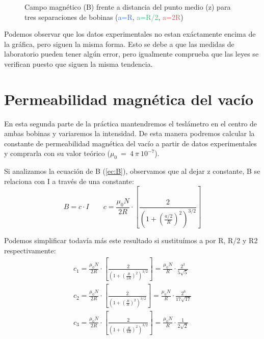 \documentclass[12pt, a4paper, titlepage]{article}
\begin{document}
  \begin{figure}[H]
    \hspace{2.5em} 
    \caption{Campo magnético (B) frente a distancia del punto medio (z) para tres separaciones de bobinas (\textcolor{RoyalBlue}{a=R}, \textcolor{MediumSeaGreen}{a=R/2}, \textcolor{IndianRed}{a=2R})}
  \end{figure}

  Podemos observar que los datos experimentales no estan exáctamente encima de la gráfica, pero siguen la misma forma. Esto se debe a que las medidas de laboratorio pueden tener algún error, pero igualmente comprueba que las leyes se verifican puesto que siguen la misma tendencia.


  \newpage
  \section{Permeabilidad magnética del vacío}

  En esta segunda parte de la práctica mantendremos el teslámetro en el centro de ambas bobinas y variaremos la intensidad. De esta manera podremos calcular la constante de permeabilidad magnética del vacío a partir de datos experimentales y comprarla con su valor teórico ($\mu_0~=~4~\pi~10^{-7}$).

  Si analizamos la ecuación de B (\ref{ec:B}), observamos que al dejar z constante, B se relaciona con I a través de una constante:
  \begin{equation}
    B = c \cdot I \qquad c = \frac{\mu_0 N}{2R} \cdot \left[\frac{2}{\left(1 + \left(\frac{a/2}{R}\right)^2 \right)^{3/2}}\right] \nonumber
  \end{equation}

  Podemos simplificar todavía más este resultado si sustituímos a por R, R/2 y R2 respectivamente:
  \begin{gather}
    c_1 = \frac{\mu_0 N}{2R} \cdot \left[\frac{2}{\left(1 + \left(\frac{R}{2R}\right)^2 \right)^{3/2}}\right] = \frac{\mu_0 N}{R} \cdot \frac{2^3}{5\sqrt{5}} \nonumber \\
    c_2 = \frac{\mu_0 N}{2R} \cdot \left[\frac{2}{\left(1 + \left(\frac{R}{R}\right)^2 \right)^{3/2}}\right] = \frac{\mu_0 N}{R} \cdot \frac{2^6}{17\sqrt{17}} \nonumber \\
    c_3 = \frac{\mu_0 N}{2R} \cdot \left[\frac{2}{\left(1 + \left(\frac{R}{4R}\right)^2 \right)^{3/2}}\right] = \frac{\mu_0 N}{R} \cdot \frac{1}{2\sqrt{2}} \nonumber
  \end{gather}
\end{document}
